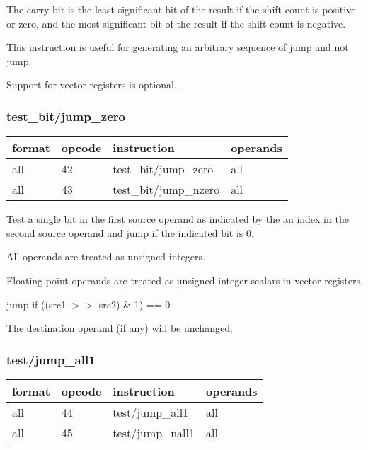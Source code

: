 \documentclass[forwardcom.tex]{subfiles}
\begin{document}
The carry bit is the least significant bit of the result if the shift count is positive or zero, and the most significant bit of the result if the shift count is negative.
\vspace{2mm}

This instruction is useful for generating an arbitrary sequence of jump and not jump.
\vspace{2mm}

Support for vector registers is optional.


\subsubsection{test\_bit/jump\_zero}
\label{table:testBitJumpZeroInstruction}
\begin{tabular}{|p{16mm}|p{12mm}|p{60mm}|p{50mm}|}
\hline
\bfseries format & \bfseries opcode & \bfseries instruction & \bfseries operands \\ \hline
all & 42 & test\_bit/jump\_zero & all \\ \hline
all & 43 & test\_bit/jump\_nzero & all \\ \hline
\end{tabular}
\vspace{2mm}

Test a single bit in the first source operand as indicated by the an index in the second source operand and jump if the indicated bit is 0. 
\vspace{2mm}

All operands are treated as unsigned integers. 

Floating point operands are treated as unsigned integer scalars in vector registers.
\vspace{2mm}

jump if ((src1 $>>$ src2) \& 1) == 0
\vspace{2mm}

The destination operand (if any) will be unchanged.

\subsubsection{test/jump\_all1}
\label{table:testJumpAll1Instruction}
\begin{tabular}{|p{16mm}|p{12mm}|p{60mm}|p{50mm}|}
\hline
\bfseries format & \bfseries opcode & \bfseries instruction & \bfseries operands \\ \hline
all & 44 & test/jump\_all1 & all \\ \hline
all & 45 & test/jump\_nall1 & all \\ \hline
\end{tabular}
\vspace{2mm}
\end{document}
